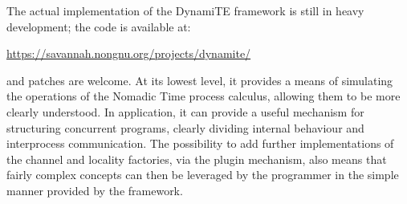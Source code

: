 The actual implementation of the DynamiTE framework is still in heavy
development; the code is available at:
\begin{center}
\url{https://savannah.nongnu.org/projects/dynamite/} 
\end{center}
\noindent and patches are welcome.  At its lowest level, it provides a
means of simulating the operations of the Nomadic Time process
calculus, allowing them to be more clearly understood.  In
application, it can provide a useful mechanism for structuring
concurrent programs, clearly dividing internal behaviour and
interprocess communication.  The possibility to add further
implementations of the channel and locality factories, via the plugin
mechanism, also means that fairly complex concepts can then be
leveraged by the programmer in the simple manner provided by the
framework.
